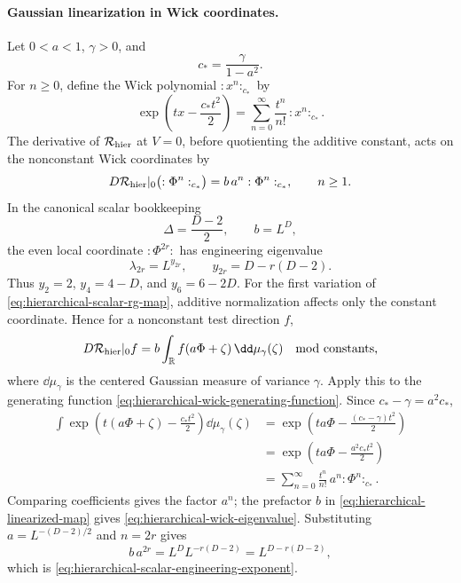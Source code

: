 \paragraph{Gaussian linearization in Wick coordinates.}
Let \(0<a<1\), \(\gamma>0\), and
\[
  c_\ast=\frac{\gamma}{1-a^2}.
\]
For \(n\geq0\), define the Wick polynomial
\(:x^n:_{c_\ast}\) by
\begin{equation}
  \exp\!\left(tx-\frac{c_\ast t^2}{2}\right)
  =
  \sum_{n=0}^\infty \frac{t^n}{n!}\,:x^n:_{c_\ast}.
  \label{eq:hierarchical-wick-generating-function}
\end{equation}
The derivative of \(\mathcal R_{\rm hier}\) at \(V=0\), before quotienting
the additive constant, acts on the nonconstant Wick coordinates by
\begin{equation}
  D\mathcal R_{\rm hier}|_0\bigl(:\Phi^n:_{c_\ast}\bigr)
  =
  b\,a^n :\Phi^n:_{c_\ast},
  \qquad n\geq1 .
  \label{eq:hierarchical-wick-eigenvalue}
\end{equation}
In the canonical scalar bookkeeping
\[
  \Delta=\frac{D-2}{2},
  \qquad b=L^D,
\]
the even local coordinate \(:\Phi^{2r}:\) has engineering eigenvalue
\begin{equation}
  \lambda_{2r}=L^{y_{2r}},
  \qquad
  y_{2r}=D-r(D-2).
  \label{eq:hierarchical-scalar-engineering-exponent}
\end{equation}
Thus \(y_2=2\), \(y_4=4-D\), and \(y_6=6-2D\).
For the first variation of \eqref{eq:hierarchical-scalar-rg-map}, additive
normalization affects only the constant coordinate.  Hence for a
nonconstant test direction \(f\),
\begin{equation}
  D\mathcal R_{\rm hier}|_0 f
  =
  b\int_{\mathbb R} f(a\Phi+\zeta)\,\dd\mu_\gamma(\zeta)
  \quad\text{mod constants},
  \label{eq:hierarchical-linearized-map}
\end{equation}
where \(\dd\mu_\gamma\) is the centered Gaussian measure of variance
\(\gamma\).  Apply this to the generating function
\eqref{eq:hierarchical-wick-generating-function}.  Since
\(c_\ast-\gamma=a^2c_\ast\),
\[
\begin{aligned}
  \int
  \exp\!\left(t(a\Phi+\zeta)-\frac{c_\ast t^2}{2}\right)
  \dd\mu_\gamma(\zeta)
  &=
  \exp\!\left(ta\Phi-\frac{(c_\ast-\gamma)t^2}{2}\right)        \\
  &=
  \exp\!\left(ta\Phi-\frac{a^2c_\ast t^2}{2}\right)             \\
  &=
  \sum_{n=0}^\infty
    \frac{t^n}{n!}\,a^n:\Phi^n:_{c_\ast}.
\end{aligned}
\]
Comparing coefficients gives the factor \(a^n\); the prefactor \(b\) in
\eqref{eq:hierarchical-linearized-map} gives
\eqref{eq:hierarchical-wick-eigenvalue}.  Substituting
\(a=L^{-(D-2)/2}\) and \(n=2r\) gives
\[
  b\,a^{2r}
  =
  L^D L^{-r(D-2)}
  =
  L^{D-r(D-2)} ,
\]
which is \eqref{eq:hierarchical-scalar-engineering-exponent}.

